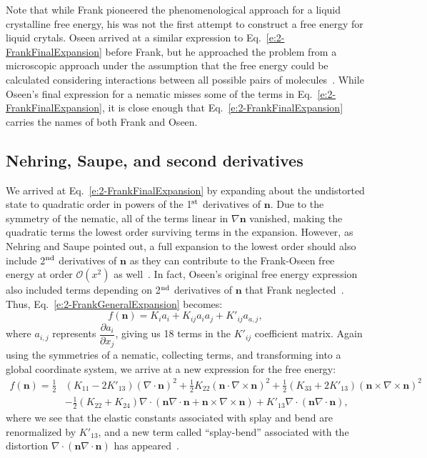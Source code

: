 Note that while Frank pioneered the phenomenological approach for a liquid crystalline free energy, his was not the first attempt to construct a free energy for liquid crytals.
Oseen arrived at a similar expression to Eq.~\ref{e:2-FrankFinalExpansion} before Frank, but he approached the problem from a microscopic approach under the assumption that the free energy could be calculated considering interactions between all possible pairs of molecules~\cite{RN205}.
While Oseen's final expression for a nematic misses some of the terms in Eq.~\ref{e:2-FrankFinalExpansion}, it is close enough that Eq.~\ref{e:2-FrankFinalExpansion} carries the names of both Frank and Oseen.


\subsection{Nehring, Saupe, and second derivatives}
We arrived at Eq.~\ref{e:2-FrankFinalExpansion} by expanding about the undistorted state to quadratic order in powers of the 1$^\textup{\rm st}$ derivatives of $\mathbf{n}$.
Due to the symmetry of the nematic, all of the terms linear in $\nabla \mathbf{n}$ vanished, making the quadratic terms the lowest order surviving terms in the expansion.
However, as Nehring and Saupe pointed out, a full expansion to the lowest order should also include 2$^\textup{\rm nd}$ derivatives of $\mathbf{n}$ as they can contribute to the Frank-Oseen free energy at order $\mathcal{O}(x^2)$ as well~\cite{RN60}.
In fact, Oseen's original free energy expression also included terms depending on 2$^\textup{\rm nd}$ derivatives of $\mathbf{n}$ that Frank neglected~\cite{RN205}.
Thus, Eq.~\ref{e:2-FrankGeneralExpansion} becomes:
\begin{equation}
  f(\mathbf{n}) = K_i a_i + K_{ij} a_i a_j + K'_{ij} a_{a,j},\label{e:2-NSGeneralExpansion}
\end{equation}
where $a_{i,j}$ represents $\dfrac{\partial a_i}{\partial x_j}$, giving us 18 terms in the $K'_{ij}$ coefficient matrix.
Again using the symmetries of a nematic, collecting terms, and transforming into a global coordinate system, we arrive at a new expression for the free energy:
\begin{align}
  f(\mathbf{n}) = \frac{1}{2}&(K_{11} - 2K'_{13}) (\nabla \cdot \mathbf{n})^2 + \frac{1}{2}K_{22} (\mathbf{n} \cdot \nabla \times \mathbf{n})^2 + \frac{1}{2}(K_{33} + 2K'_{13}) (\mathbf{n} \times \nabla \times \mathbf{n})^2 \nonumber \\
    & - \frac{1}{2}(K_{22} + K_{24}) \nabla \cdot (\mathbf{n}\nabla \cdot \mathbf{n} + \mathbf{n} \times \nabla \times \mathbf{n})
      + K'_{13} \nabla \cdot (\mathbf{n} \nabla \cdot \mathbf{n}),\label{e:2-NSFinalExpansion}
\end{align}
where we see that the elastic constants associated with splay and bend are renormalized by $K'_{13}$, and a new term called ``splay-bend'' associated with the distortion $\nabla \cdot (\mathbf{n} \nabla \cdot \mathbf{n})$ has appeared~\cite{RN60}. \\

